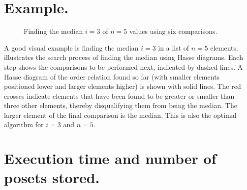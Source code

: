 \documentclass[a4paper,UKenglish,cleveref, autoref, thm-restate]{lipics-v2021}
\begin{document}




\clearpage
\appendix

\section{Example.}
\begin{figure}[!b]
  \centering
  
  \caption{Finding the median $i = 3$ of $n = 5$ values using six comparisons.}
  \label{fig:median_of_5}
\end{figure}

A good visual example is finding the median $i = 3$ in a list of $n = 5$ elements.
 illustrates the search process of finding the median using Hasse diagrams.
Each step shows the comparisons to be performed next, indicated by dashed lines.
A Hasse diagram of the order relation found so far (with smaller elements positioned lower and larger elements higher) is shown with solid lines.
The red crosses indicate elements that have been found to be greater or smaller than three other elements, thereby disqualifying them from being the median.
The larger element of the final comparison is the median.
This is also the optimal algorithm for $i = 3$ and $n = 5$.




\section{Execution time and number of posets stored.}
\end{document}
